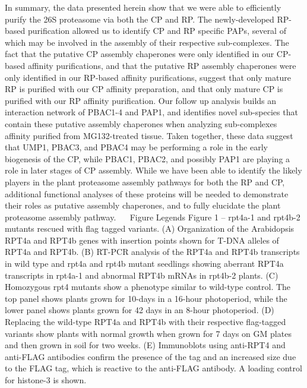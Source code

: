 In summary, the data presented herein show that we were able to efficiently purify the 26S proteasome via both the CP and RP. The newly-developed RP-based purification allowed us to identify CP and RP specific PAPs, several of which may be involved in the assembly of their respective sub-complexes. The fact that the putative CP assembly chaperones were only identified in our CP-based affinity purifications, and that the putative RP assembly chaperones were only identified in our RP-based affinity purifications, suggest that only mature RP is purified with our CP affinity preparation, and that only mature CP is purified with our RP affinity purification. Our follow up analysis builds an interaction network of PBAC1-4 and PAP1, and identifies novel sub-species that contain these putative assembly chaperones when analyzing sub-complexes affinity purified from MG132-treated tissue. Taken together, these data suggest that UMP1, PBAC3, and PBAC4 may be performing a role in the early biogenesis of the CP, while PBAC1, PBAC2, and possibly PAP1 are playing a role in later stages of CP assembly. While we have been able to identify the likely players in the plant proteasome assembly pathways for both the RP and CP, additional functional analyses of these proteins will be needed to demonstrate their roles as putative assembly chaperones, and to fully elucidate the plant proteasome assembly pathway.
  
Figure Legends
Figure 1 – rpt4a-1 and rpt4b-2 mutants rescued with flag tagged variants. (A) Organization of the Arabidopsis RPT4a and RPT4b genes with insertion points shown for T-DNA alleles of RPT4a and RPT4b. (B) RT-PCR analysis of the RPT4a and RPT4b transcripts in wild type and rpt4a and rpt4b mutant seedlings showing aberrant RPT4a transcripts in rpt4a-1 and abnormal RPT4b mRNAs in rpt4b-2 plants. (C) Homozygous rpt4 mutants show a phenotype similar to wild-type control. The top panel shows plants grown for 10-days in a 16-hour photoperiod, while the lower panel shows plants grown for 42 days in an 8-hour photoperiod. (D) Replacing the wild-type RPT4a and RPT4b with their respective flag-tagged variants show plants with normal growth when grown for 7 days on GM plates and then grown in soil for two weeks. (E) Immunoblots using anti-RPT4 and anti-FLAG antibodies confirm the presence of the tag and an increased size due to the FLAG tag, which is reactive to the anti-FLAG antibody. A loading control for histone-3 is shown.

